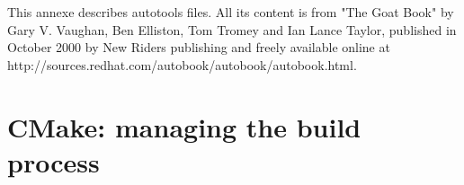

This annexe describes autotools files. All its content is from "The Goat Book"
by Gary V. Vaughan, Ben Elliston, Tom Tromey and Ian Lance Taylor, published 
in October 2000 by New Riders publishing and freely available online at 
http://sources.redhat.com/autobook/autobook/autobook.html.


\section{CMake: managing the build process}

